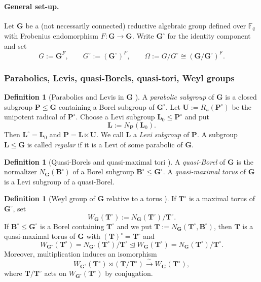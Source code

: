 \documentclass{amsart}
\theoremstyle{plain}
\numberwithin{equation}{section}
\theoremstyle{definition}
\newtheorem{definition}[theorem]{Definition}
\newcommand{\F}{\mathbb{F}}
\begin{document}
\paragraph{General set-up.}
Let $\mathbf G$ be a (not necessarily connected) reductive algebraic group defined over $\F_q$
with Frobenius endomorphism $F:\mathbf G\to \mathbf G$.
Write $\mathbf G^\circ$ for the identity component and set
\[
G:=\mathbf G^F,\qquad G^\circ := (\mathbf G^\circ)^F,\qquad
\Omega := G/G^\circ \cong (\mathbf G/\mathbf G^\circ)^F .
\]

\subsubsection{Parabolics, Levis, quasi-Borels, quasi-tori, Weyl groups}

\begin{definition}[Parabolics and Levis in $\mathbf G$ {\cite[Def.~6.1.1--6.1.2]{Bonnafe1999Produit}}]\label{def:disconn-parabolic}
A \emph{parabolic subgroup} of $\mathbf G$ is a closed subgroup $\mathbf P\le \mathbf G$
containing a Borel subgroup of $\mathbf G^\circ$.
Let $\mathbf U:=R_u(\mathbf P^\circ)$ be the unipotent radical of $\mathbf P^\circ$.
Choose a Levi subgroup $\mathbf L_0\le \mathbf P^\circ$ and put
\[
\mathbf L:=N_{\mathbf P}(\mathbf L_0).
\]
Then $\mathbf L^\circ=\mathbf L_0$ and $\mathbf P=\mathbf L\ltimes \mathbf U$.
We call $\mathbf L$ a \emph{Levi subgroup} of $\mathbf P$.
A subgroup $\mathbf L\le \mathbf G$ is called \emph{regular} if it is a Levi of some parabolic of $\mathbf G$.
\end{definition}

\begin{definition}[Quasi-Borels and quasi-maximal tori {\cite[Def.~6.1.3]{Bonnafe1999Produit}}]
A \emph{quasi-Borel} of $\mathbf G$ is the normalizer $N_{\mathbf G}(\mathbf B^\circ)$
of a Borel subgroup $\mathbf B^\circ\le \mathbf G^\circ$.
A \emph{quasi-maximal torus} of $\mathbf G$ is a Levi subgroup of a quasi-Borel.
\end{definition}

\begin{definition}[Weyl group of $\mathbf G$ relative to a torus {\cite[Def.~6.1.4]{Bonnafe1999Produit}}]
If $\mathbf T^\circ$ is a maximal torus of $\mathbf G^\circ$, set
\[
W_{\mathbf G}(\mathbf T^\circ):=N_{\mathbf G}(\mathbf T^\circ)/\mathbf T^\circ .
\]
If $\mathbf B^\circ\le \mathbf G^\circ$ is a Borel containing $\mathbf T^\circ$ and we put
$\mathbf T:=N_{\mathbf G}(\mathbf T^\circ,\mathbf B^\circ)$,
then $\mathbf T$ is a quasi-maximal torus of $\mathbf G$ with $(\mathbf T)^\circ=\mathbf T^\circ$ and
\[
W_{\mathbf G^\circ}(\mathbf T^\circ)
=
N_{\mathbf G^\circ}(\mathbf T^\circ)/\mathbf T^\circ
\trianglelefteq
W_{\mathbf G}(\mathbf T^\circ)
=
N_{\mathbf G}(\mathbf T^\circ)/\mathbf T^\circ .
\]
Moreover,  multiplication induces an isomorphism
\[
W_{\mathbf G^\circ}(\mathbf T^\circ)\rtimes
(\mathbf T/\mathbf T^\circ)
\xrightarrow{\;\sim\;}
W_{\mathbf G}(\mathbf T^\circ),
\]
where \(\mathbf T/\mathbf T^\circ\) acts on
\(W_{\mathbf G^\circ}(\mathbf T^\circ)\) by conjugation.
\end{definition}
\end{document}
